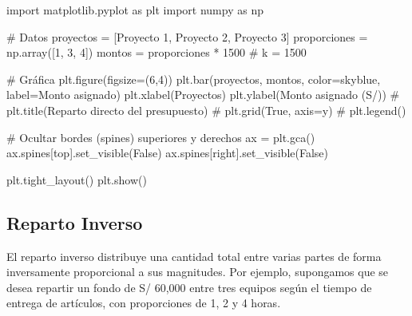 \documentclass[
  stu,
  floatsintext,
  longtable,
  a4paper,
  nolmodern,
  notxfonts,
  notimes,
  12pt,
  colorlinks=true,linkcolor=blue,citecolor=blue,urlcolor=blue]{apa7}
\newenvironment{Shaded}{\begin{snugshade}}{\end{snugshade}}
\newcommand{\CommentTok}[1]{\textcolor[rgb]{0.37,0.37,0.37}{#1}}
\newcommand{\DecValTok}[1]{\textcolor[rgb]{0.68,0.00,0.00}{#1}}
\newcommand{\ImportTok}[1]{\textcolor[rgb]{0.00,0.46,0.62}{#1}}
\newcommand{\NormalTok}[1]{\textcolor[rgb]{0.00,0.23,0.31}{#1}}
\newcommand{\OperatorTok}[1]{\textcolor[rgb]{0.37,0.37,0.37}{#1}}
\newcommand{\StringTok}[1]{\textcolor[rgb]{0.13,0.47,0.30}{#1}}
\newcommand{\VariableTok}[1]{\textcolor[rgb]{0.07,0.07,0.07}{#1}}
\begin{document}
\begin{Shaded}
\begin{Highlighting}[]
\ImportTok{import}\NormalTok{ matplotlib.pyplot }\ImportTok{as}\NormalTok{ plt}
\ImportTok{import}\NormalTok{ numpy }\ImportTok{as}\NormalTok{ np}

\CommentTok{\# Datos}
\NormalTok{proyectos }\OperatorTok{=}\NormalTok{ [}\StringTok{\textquotesingle{}Proyecto 1\textquotesingle{}}\NormalTok{, }\StringTok{\textquotesingle{}Proyecto 2\textquotesingle{}}\NormalTok{, }\StringTok{\textquotesingle{}Proyecto 3\textquotesingle{}}\NormalTok{]}
\NormalTok{proporciones }\OperatorTok{=}\NormalTok{ np.array([}\DecValTok{1}\NormalTok{, }\DecValTok{3}\NormalTok{, }\DecValTok{4}\NormalTok{])}
\NormalTok{montos }\OperatorTok{=}\NormalTok{ proporciones }\OperatorTok{*} \DecValTok{1500}  \CommentTok{\# k = 1500}

\CommentTok{\# Gráfica}
\NormalTok{plt.figure(figsize}\OperatorTok{=}\NormalTok{(}\DecValTok{6}\NormalTok{,}\DecValTok{4}\NormalTok{))}
\NormalTok{plt.bar(proyectos, montos, color}\OperatorTok{=}\StringTok{\textquotesingle{}skyblue\textquotesingle{}}\NormalTok{, label}\OperatorTok{=}\StringTok{\textquotesingle{}Monto asignado\textquotesingle{}}\NormalTok{)}
\NormalTok{plt.xlabel(}\StringTok{\textquotesingle{}Proyectos\textquotesingle{}}\NormalTok{)}
\NormalTok{plt.ylabel(}\StringTok{\textquotesingle{}Monto asignado (S/)\textquotesingle{}}\NormalTok{)}
\CommentTok{\# plt.title(\textquotesingle{}Reparto directo del presupuesto\textquotesingle{})}
\CommentTok{\# plt.grid(True, axis=\textquotesingle{}y\textquotesingle{})}
\CommentTok{\# plt.legend()}

\CommentTok{\# Ocultar bordes (spines) superiores y derechos}
\NormalTok{ax }\OperatorTok{=}\NormalTok{ plt.gca()}
\NormalTok{ax.spines[}\StringTok{\textquotesingle{}top\textquotesingle{}}\NormalTok{].set\_visible(}\VariableTok{False}\NormalTok{)}
\NormalTok{ax.spines[}\StringTok{\textquotesingle{}right\textquotesingle{}}\NormalTok{].set\_visible(}\VariableTok{False}\NormalTok{)}

\NormalTok{plt.tight\_layout()}
\NormalTok{plt.show()}
\end{Highlighting}
\end{Shaded}

\subsection{Reparto Inverso}\label{reparto-inverso}

El reparto inverso distribuye una cantidad total entre varias partes de
forma inversamente proporcional a sus magnitudes. Por ejemplo,
supongamos que se desea repartir un fondo de S/ 60,000 entre tres
equipos según el tiempo de entrega de artículos, con proporciones de 1,
2 y 4 horas.
\end{document}
